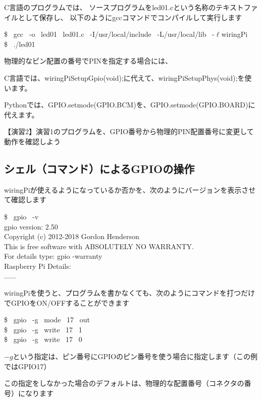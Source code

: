 \documentclass[uplatex,a4paper,11pt,oneside,openany]{jsbook}
\begin{document}
C言語のプログラムでは、
ソースプログラムをled01.cという名称のテキストファイルとして保存し、
以下のようにgccコマンドでコンパイルして実行します

\begin{screen}
\$ \, gcc \, -o \, led01 \, led01.c \, -I/usr/local/include \, -L/usr/local/lib \, -$\ell$wiringPi\\
\$ \, ./led01
\end{screen}

物理的なピン配置の番号でPINを指定する場合には、

C言語では、wiringPiSetupGpio(void);に代えて、wiringPiSetupPhys(void);を使います。

Pythonでは、GPIO.setmode(GPIO.BCM)を、GPIO.setmode(GPIO.BOARD)に代えます。

【演習2】演習1のプログラムを、GPIO番号から物理的PIN配置番号に変更して動作を確認しよう

\subsection{シェル（コマンド）によるGPIOの操作}

wiringPiが使えるようになっているか否かを、次のようにバージョンを表示させて確認します

\begin{screen}
\$ \, gpio \, -v\\
gpio version: 2.50\\
Copyright (c) 2012-2018 Gordon Henderson\\
This is free software with ABSOLUTELY NO WARRANTY.\\
For details type: gpio -warranty\\
Raspberry Pi Details:\\
......
\end{screen}

wiringPiを使うと、プログラムを書かなくても、次のようにコマンドを打つだけでGPIOをON/OFFすることができます

\begin{screen}
\$ \, gpio \, -g \, mode \, 17 \, out\\
\$ \, gpio \, -g \, write \, 17 \, 1\\
\$ \, gpio \, -g \, write \, 17 \, 0
\end{screen}

$-g$という指定は、ピン番号にGPIOのピン番号を使う場合に指定します（この例ではGPIO17）

この指定をしなかった場合のデフォルトは、物理的な配置番号（コネクタの番号）になります
\end{document}
